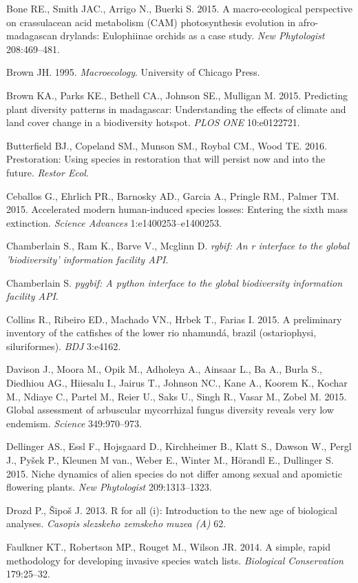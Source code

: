 \documentclass[author-year, review, 11pt]{components/elsarticle} %
\begin{document}
Bone RE., Smith JAC., Arrigo N., Buerki S. 2015. A macro-ecological
perspective on crassulacean acid metabolism (CAM) photosynthesis
evolution in afro-madagascan drylands: Eulophiinae orchids as a case
study. \emph{New Phytologist} 208:469--481.

Brown JH. 1995. \emph{Macroecology}. University of Chicago Press.

Brown KA., Parks KE., Bethell CA., Johnson SE., Mulligan M. 2015.
Predicting plant diversity patterns in madagascar: Understanding the
effects of climate and land cover change in a biodiversity hotspot.
\emph{PLOS ONE} 10:e0122721.

Butterfield BJ., Copeland SM., Munson SM., Roybal CM., Wood TE. 2016.
Prestoration: Using species in restoration that will persist now and
into the future. \emph{Restor Ecol}.

Ceballos G., Ehrlich PR., Barnosky AD., Garcia A., Pringle RM., Palmer
TM. 2015. Accelerated modern human-induced species losses: Entering the
sixth mass extinction. \emph{Science Advances} 1:e1400253--e1400253.

Chamberlain S., Ram K., Barve V., Mcglinn D. \emph{rgbif: An r interface
to the global 'biodiversity' information facility API}.

Chamberlain S. \emph{pygbif: A python interface to the global
biodiversity information facility API}.

Collins R., Ribeiro ED., Machado VN., Hrbek T., Farias I. 2015. A
preliminary inventory of the catfishes of the lower rio nhamundá, brazil
(ostariophysi, siluriformes). \emph{BDJ} 3:e4162.

Davison J., Moora M., Opik M., Adholeya A., Ainsaar L., Ba A., Burla S.,
Diedhiou AG., Hiiesalu I., Jairus T., Johnson NC., Kane A., Koorem K.,
Kochar M., Ndiaye C., Partel M., Reier U., Saks U., Singh R., Vasar M.,
Zobel M. 2015. Global assessment of arbuscular mycorrhizal fungus
diversity reveals very low endemism. \emph{Science} 349:970--973.

Dellinger AS., Essl F., Hojsgaard D., Kirchheimer B., Klatt S., Dawson
W., Pergl J., Py{š}ek P., Kleunen M van., Weber E., Winter M., Hörandl
E., Dullinger S. 2015. Niche dynamics of alien species do not differ
among sexual and apomictic flowering plants. \emph{New Phytologist}
209:1313--1323.

Drozd P., {Š}ipo{š} J. 2013. R for all (i): Introduction to the new age
of biological analyses. \emph{Casopis slezskeho zemskeho muzea (A)} 62.

Faulkner KT., Robertson MP., Rouget M., Wilson JR. 2014. A simple, rapid
methodology for developing invasive species watch lists.
\emph{Biological Conservation} 179:25--32.
\end{document}
